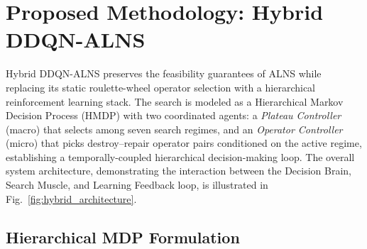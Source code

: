 \documentclass[conference]{IEEEtran}
\begin{document}
\section{Proposed Methodology: Hybrid DDQN-ALNS}
\label{sec:methodology}

Hybrid DDQN-ALNS preserves the feasibility guarantees of ALNS while replacing
its static roulette-wheel operator selection with a hierarchical reinforcement
learning stack.  The search is modeled as a Hierarchical Markov Decision
Process (HMDP) with two coordinated agents: a \emph{Plateau Controller}
(macro) that selects among seven search regimes, and an \emph{Operator Controller}
(micro) that picks destroy--repair operator pairs conditioned on the active
regime, establishing a temporally-coupled hierarchical decision-making loop. The overall system architecture, demonstrating the interaction between the Decision Brain, Search Muscle, and Learning Feedback loop, is illustrated in Fig.~\ref{fig:hybrid_architecture}.

\subsection{Hierarchical MDP Formulation}
\end{document}
